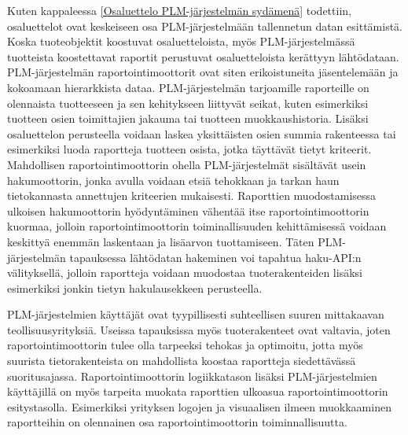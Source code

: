 Kuten kappaleessa \ref{Osaluettelo PLM-järjestelmän sydämenä} todettiin, osaluettelot ovat keskeiseen osa PLM-järjestelmään tallennetun datan esittämistä. Koska tuoteobjektit koostuvat osaluetteloista, myös PLM-järjestelmässä tuotteista koostettavat raportit perustuvat osaluetteloista kerättyyn lähtödataan. PLM-järjestelmän raportointimoottorit ovat siten erikoistuneita jäsentelemään ja kokoamaan hierarkkista dataa. PLM-järjestelmän tarjoamille raporteille on olennaista tuotteeseen ja sen kehitykseen liittyvät seikat, kuten esimerkiksi tuotteen osien toimittajien jakauma tai tuotteen muokkaushistoria. Lisäksi osaluettelon perusteella voidaan laskea yksittäisten osien summia rakenteessa tai esimerkiksi luoda raportteja tuotteen osista, jotka täyttävät tietyt kriteerit.
Mahdollisen raportointimoottorin ohella PLM-järjestelmät sisältävät usein hakumoottorin, jonka avulla voidaan etsiä tehokkaan ja tarkan haun tietokannasta annettujen kriteerien mukaisesti. Raporttien muodostamisessa ulkoisen hakumoottorin hyödyntäminen vähentää itse raportointimoottorin kuormaa, jolloin raportointimoottorin toiminallisuuden kehittämisessä voidaan keskittyä enemmän laskentaan ja lisäarvon tuottamiseen. Täten PLM-järjestelmän tapauksessa lähtödatan hakeminen voi tapahtua haku-API:n välityksellä, jolloin raportteja voidaan muodostaa tuoterakenteiden lisäksi esimerkiksi jonkin tietyn hakulausekkeen perusteella.

PLM-järjestelmien käyttäjät ovat tyypillisesti suhteellisen suuren mittakaavan teollisuusyrityksiä. Useissa tapauksissa myös tuoterakenteet ovat valtavia, joten raportointimoottorin tulee olla tarpeeksi tehokas ja optimoitu, jotta myös suurista tietorakenteista on mahdollista koostaa raportteja siedettävässä suoritusajassa. Raportointimoottorin logiikkatason lisäksi PLM-järjestelmien käyttäjillä on myös tarpeita muokata raporttien ulkoasua raportointimoottorin esitystasolla. Esimerkiksi yrityksen logojen ja visuaalisen ilmeen muokkaaminen raportteihin on olennainen osa raportointimoottorin toiminnallisuutta.
